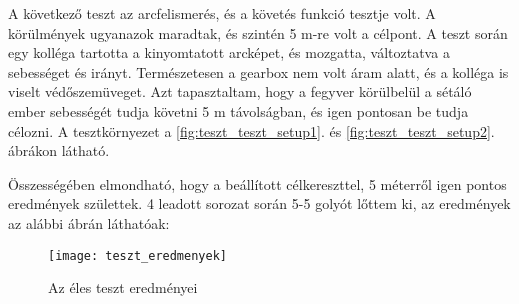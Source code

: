 A következő teszt az arcfelismerés, és a követés funkció tesztje volt. A körülmények ugyanazok maradtak, és szintén 5 m-re volt a célpont. A teszt során egy kolléga tartotta a kinyomtatott arcképet, és mozgatta, változtatva a sebességet és irányt. Természetesen a gearbox nem volt áram alatt, és a kolléga is viselt védőszemüveget. Azt tapasztaltam, hogy a fegyver körülbelül a sétáló ember sebességét tudja követni 5 m távolságban, és igen pontosan be tudja célozni. A tesztkörnyezet a \ref{fig:teszt_teszt_setup1}. és \ref{fig:teszt_teszt_setup2}. ábrákon látható.

Összességében elmondható, hogy a beállított célkereszttel, 5 méterről igen pontos eredmények születtek. 4 leadott sorozat során 5-5 golyót lőttem ki, az eredmények az alábbi ábrán láthatóak:

\begin{figure}[h!]
	\centering
	\texttt{[image: teszt\_eredmenyek]}
	\caption{Az éles teszt eredményei}
	\label{fig:teszt_eredmenyek}
\end{figure}